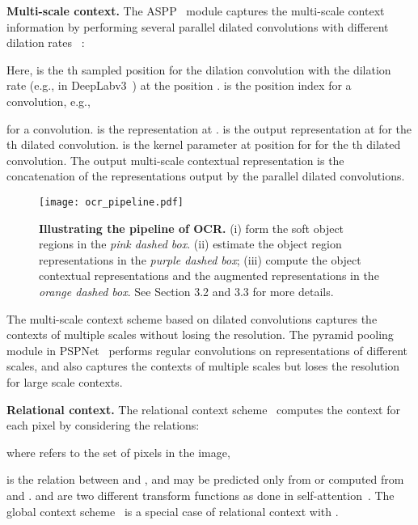 \documentclass[runningheads]{llncs}
\begin{document}
\noindent\textbf{Multi-scale context.}
The ASPP~\cite{chen2018deeplab} module captures the multi-scale context information
by performing several parallel dilated convolutions with different dilation rates ~\cite{chen2018deeplab,chen2017rethinking,yu2015multi}:

Here, 
is the th sampled position
for the dilation convolution with the dilation rate 
(e.g.,  in DeepLabv3~\cite{chen2017rethinking})
at the position .
 is the position index for a convolution,
e.g.,

for a  convolution.
 is the representation
at .
 is the 
output representation
at 
for the th dilated convolution.
 is the kernel parameter
at position  for for the th dilated convolution.
The output multi-scale contextual representation
is the concatenation 
of the representations output by the parallel dilated convolutions. 


\begin{figure*}[t]
\centering
\resizebox{\linewidth}{!}
{
\texttt{[image: ocr\_pipeline.pdf]}
}
\caption{\small{
\textbf{
Illustrating the pipeline of OCR.
}
(i) form the soft object regions in the \emph{{\color{carnationpink}pink} dashed box}.
(ii) estimate the object region representations in the \emph{{\color{darkpastelpurple}purple} dashed box};
(iii) compute the object contextual representations and the augmented representations 
in the \emph{{\color{goldenpoppy}orange} dashed box}.
See Section 3.2 and 3.3
for more details.
}}
\label{fig:ocr_pipeline}
\end{figure*}


The multi-scale context scheme 
based on dilated convolutions
captures the contexts of multiple scales
without losing the resolution.
The pyramid pooling module in PSPNet~\cite{zhao2017pyramid}
performs regular convolutions
on representations of different scales,
and also captures the contexts of multiple scales
but loses the resolution for large scale contexts.


\noindent\textbf{Relational context.}
The relational context scheme~\cite{fu2018dual,yuan2018ocnet,zhang2019co}
computes the context for each pixel
by considering the relations:

where 
refers to the set of pixels in the image,

is the relation 
between 
and 
,
and may be predicted
only from 
or computed from 
and 
.
 and  are two
different transform functions 
as done in self-attention~\cite{vaswani2017attention}.
The global context scheme~\cite{liu2015parsenet} is 
a special case of relational context with .
\end{document}
